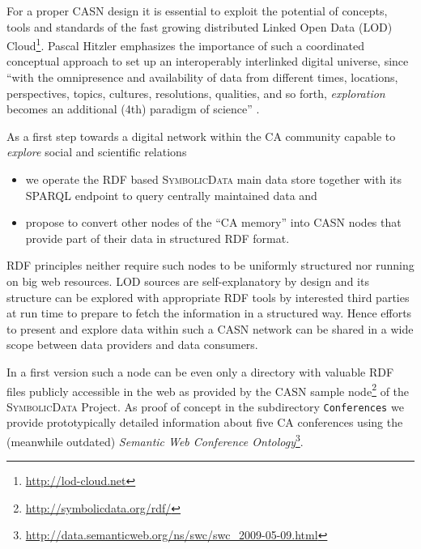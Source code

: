 \documentclass[a4paper,11pt]{article}
\def\SD{\textsc{Symbolic\-Data}}
\begin{document}
\begin{multicols}{2}
For a proper CASN design it is essential to exploit the potential of concepts,
tools and standards of the fast growing distributed Linked Open Data (LOD)
Cloud\footnote{ \url{http://lod-cloud.net}}.  Pascal Hitzler emphasizes the
importance of such a coordinated conceptual approach to set up an
interoperably interlinked digital universe, since ``with the omnipresence and
availability of data from different times, locations, perspectives, topics,
cultures, resolutions, qualities, and so forth, \emph{exploration} becomes an
additional (4th) paradigm of science'' \cite{hitzler-13}.

As a first step towards a digital network within the CA community capable to
\emph{explore} social and scientific relations
\begin{itemize}
\item we operate the RDF based {\SD} main data store together with its SPARQL
  endpoint \cite{sdsparql} to query centrally maintained data and
\item propose to convert other nodes of the ``CA memory'' into CASN nodes that
  provide part of their data in structured RDF format.
\end{itemize}
RDF principles neither require such nodes to be uniformly structured nor
running on big web resources. LOD sources are self-explanatory by design and
its structure can be explored with appropriate RDF tools by interested third
parties at run time to prepare to fetch the information in a structured way.
Hence efforts to present and explore data within such a CASN network can be
shared in a wide scope between data providers and data consumers.

In a first version such a node can be even only a directory with valuable RDF
files publicly accessible in the web as provided by the CASN sample
node\footnote{ \url{http://symbolicdata.org/rdf/}} of the {\SD} Project. As
proof of concept in the subdirectory \texttt{Conferences} we provide
prototypically detailed information about five CA conferences using the
(meanwhile outdated) \emph{Semantic Web Conference Ontology}\footnote{
  \url{http://data.semanticweb.org/ns/swc/swc_2009-05-09.html}}.


\end{multicols}
\end{document}
